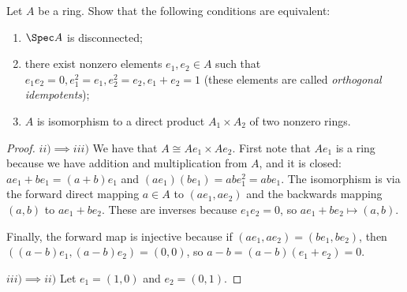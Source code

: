 \begin{exercise}
	Let $A$ be a ring. Show that the following conditions are equivalent:
	\begin{enumerate}
		\item $\Spec A $ is disconnected;
		\item there exist nonzero elements $e_{1},e_{2}\in A $ such that $e_{1}e_{2} = 0, e_{1}^2=e_{1},e_{2}^2=e_{2}, e_{1}+e_{2}=1$ (these elements are called \textit{orthogonal idempotents});
		\item $A $ is isomorphism to a direct product $A_{1}\times A_{2} $ of two nonzero rings.
	\end{enumerate}
\end{exercise}
\begin{proof}
	$ii) \implies iii) $ We have that $A \cong Ae_{1} \times Ae_{2}$.
	First note that $Ae_{1} $ is a ring because we have addition and multiplication from $A $, and it is closed: $ae_{1} + be_{1} = (a+b)e_{1} $ and $(ae_{1})(be_{1}) = abe_{1}^2=abe_{1} $.
	The isomorphism is via the forward direct mapping $a \in A $ to $(ae_{1},ae_{2}) $ and the backwards mapping $(a,b) $ to $ae_{1}+be_{2} $.
	These are inverses because $e_{1}e_{2}=0 $, so $ae_{1}+be_{2}\mapsto (a,b) $.

	Finally, the forward map is injective because if $(ae_{1},ae_{2}) = (be_{1},be_{2}) $, then $((a-b)e_{1},(a-b)e_{2}) = (0,0) $, so $a-b = (a-b)(e_{1}+e_{2}) = 0 $.

	$iii) \implies ii) $ Let $e_{1}=(1,0) $ and $e_{2}=(0,1) $.


\end{proof}
